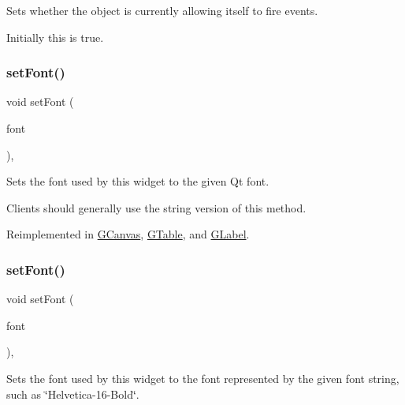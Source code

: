 Sets whether the object is currently allowing itself to fire events. 

Initially this is true. \mbox{\label{classGInteractor_a2592348886ffea646c6534bf88f7c49d}} 
\subsubsection{\texorpdfstring{set\+Font()}{setFont()}\hspace{0.1cm}{\footnotesize\ttfamily [1/2]}}
{\footnotesize\ttfamily void set\+Font (\begin{DoxyParamCaption}\item[{const Q\+Font \&}]{font }\end{DoxyParamCaption})\hspace{0.3cm}{\ttfamily [virtual]}, {\ttfamily [inherited]}}



Sets the font used by this widget to the given Qt font. 

Clients should generally use the string version of this method. 

Reimplemented in \mbox{\hyperlink{classGCanvas_ad1d75b3840a41ba7d1e8a921696dc684}{G\+Canvas}}, \mbox{\hyperlink{classGTable_ad1d75b3840a41ba7d1e8a921696dc684}{G\+Table}}, and \mbox{\hyperlink{classGLabel_ad1d75b3840a41ba7d1e8a921696dc684}{G\+Label}}.

\mbox{\label{classGInteractor_a8e096e8818d838aceae1d46d58fb3a7b}} 
\subsubsection{\texorpdfstring{set\+Font()}{setFont()}\hspace{0.1cm}{\footnotesize\ttfamily [2/2]}}
{\footnotesize\ttfamily void set\+Font (\begin{DoxyParamCaption}\item[{const std\+::string \&}]{font }\end{DoxyParamCaption})\hspace{0.3cm}{\ttfamily [virtual]}, {\ttfamily [inherited]}}



Sets the font used by this widget to the font represented by the given font string, such as \char`\"{}\+Helvetica-\/16-\/\+Bold\char`\"{}. 


